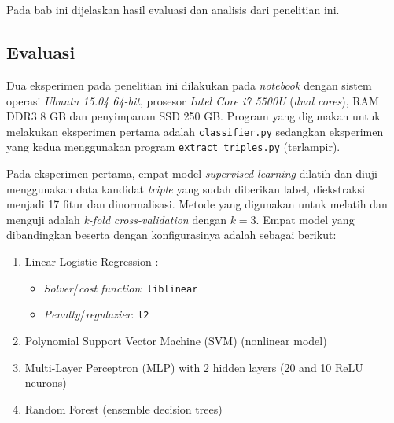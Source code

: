 \chapter{\babEmpat}
\label{chap:babEmpat}

Pada bab ini dijelaskan hasil evaluasi dan analisis dari penelitian ini.

\section{Evaluasi}

Dua eksperimen pada penelitian ini dilakukan pada \textit{notebook} dengan sistem operasi \textit{Ubuntu 15.04 64-bit}, prosesor \textit{Intel Core i7 5500U} (\textit{dual cores}), RAM DDR3 8 GB dan penyimpanan SSD 250 GB. Program yang digunakan untuk melakukan eksperimen pertama adalah \verb|classifier.py| sedangkan eksperimen yang kedua menggunakan program \verb|extract_triples.py| (terlampir).

Pada eksperimen pertama, empat model \textit{supervised learning} dilatih dan diuji menggunakan data kandidat \textit{triple} yang sudah diberikan label, diekstraksi menjadi 17 fitur dan dinormalisasi. Metode yang digunakan untuk melatih dan menguji adalah \textit{k-fold} \textit{cross-validation} \citep{kohavi1995study} dengan $k = 3$. Empat model yang dibandingkan beserta dengan konfigurasinya adalah sebagai berikut:

\begin{enumerate}
	\item Linear Logistic Regression \citep{fan2008liblinear}:
	\begin{itemize}
		\item \textit{Solver}/\textit{cost function}: \verb|liblinear|
		\item \textit{Penalty}/\textit{regulazier}: \verb|l2|
	\end{itemize}
	\item Polynomial Support Vector Machine (SVM)\citep{chang2011libsvm} (nonlinear model)
	\item Multi-Layer Perceptron (MLP)\citep{hinton1989connectionist} with 2 hidden layers (20 and 10 ReLU\citep{nair2010rectified} neurons)
	\item Random Forest\citep{wasserman2015grid} (ensemble decision trees)
\end{enumerate}

